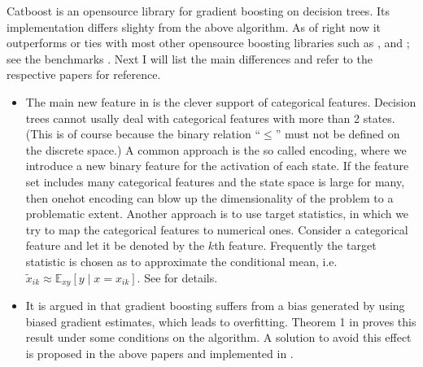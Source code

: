 \documentclass[letterpaper,10pt,english]{sphinxmanual}
\begin{document}
Catboost is an open\sphinxhyphen{}source library for gradient boosting on decision trees. Its implementation differs slighty from the above algorithm. As of right now it outperforms or ties with most other open\sphinxhyphen{}source boosting libraries such as ,  and ; see the benchmarks . Next I will list the main differences and refer to the respective papers for reference.
\begin{itemize}
\item {} 
The main new feature in  is the clever support of categorical features. Decision trees cannot usally deal with categorical features with more than 2 states. (This is of course because the binary relation “\(\leq\)” must not be defined on the discrete space.) A common approach is the so called  encoding, where we introduce a new binary feature for the activation of each state. If the feature set includes many categorical features and the state space is large for many, then one\sphinxhyphen{}hot encoding can blow up the dimensionality of the problem to a problematic extent. Another approach is to use target statistics, in which we try to map the categorical features to numerical ones. Consider a categorical feature and let it be denoted by the \(k\)\sphinxhyphen{}th feature. Frequently the target statistic is chosen as to approximate the conditional mean, i.e. \(\tilde{x}_{ik} \approx \mathbb{E}_{xy}\left[y \mid x = x_{ik}\right]\). See  for details.

\item {} 
It is argued in  that gradient boosting suffers from a bias generated by using biased gradient estimates, which leads to overfitting. Theorem 1 in  proves this result under some conditions on the algorithm. A solution to avoid this effect is proposed in the above papers and implemented in .


\end{itemize}
\end{document}
